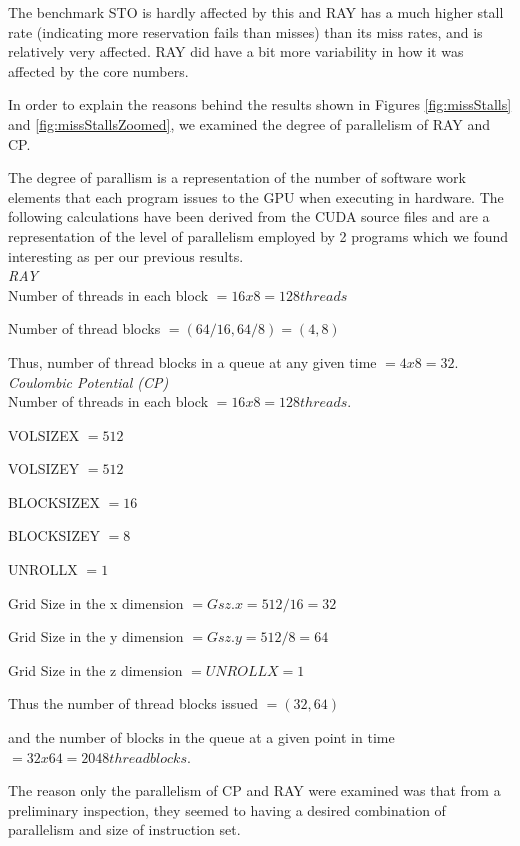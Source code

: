 The benchmark STO is hardly affected by this and RAY has a much higher stall rate (indicating more reservation fails than misses) than its miss rates, and is relatively very affected. RAY did have a bit more variability in how it was affected by the core numbers.

In order to explain the reasons behind the results shown in Figures \ref{fig:missStalls} and \ref{fig:missStallsZoomed}, we examined the degree of parallelism of RAY and CP.

The degree of parallism is a representation of the number of software work elements that each program issues to the GPU when executing in hardware. The following calculations have been derived from the CUDA source files and are a representation of the level of parallelism employed by 2 programs which we found interesting as per our previous results. \\

\emph{RAY}\\

Number of threads in each block $= 16 x 8 = 128 threads$

Number of thread blocks $= (64/16, 64/8) = (4,8)$

Thus, number of thread blocks in a queue at any given time $= 4 x 8 = 32.$
\\

\emph{Coulombic Potential (CP)}\\

Number of threads in each block $= 16 x 8 = 128 threads.$

VOLSIZEX $= 512$

VOLSIZEY $= 512$

BLOCKSIZEX $= 16$

BLOCKSIZEY $= 8$

UNROLLX  $= 1$

Grid Size in the x dimension $= Gsz.x = 512/16 = 32$

Grid Size in the y dimension $= Gsz.y = 512/8 = 64$

Grid Size in the z dimension $= UNROLLX = 1$

Thus the number of thread blocks issued $= (32, 64)$

and the number of blocks in the queue at a given point in time $= 32 x 64 = 2048 thread blocks.$

The reason only the parallelism of CP and RAY were examined was that from a preliminary inspection, they seemed to having a desired combination of parallelism and size of instruction set. 

